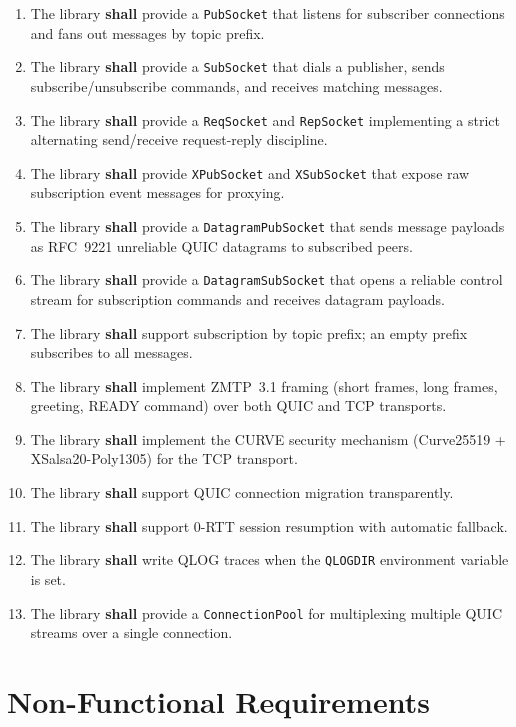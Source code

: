\documentclass[12pt, a4paper, oneside]{report}
\begin{document}
\begin{enumerate}[label=FR-\arabic*]
  \item The library \textbf{shall} provide a \texttt{PubSocket} that listens for subscriber connections and fans out messages by topic prefix.
  \item The library \textbf{shall} provide a \texttt{SubSocket} that dials a publisher, sends subscribe/unsubscribe commands, and receives matching messages.
  \item The library \textbf{shall} provide a \texttt{ReqSocket} and \texttt{RepSocket} implementing a strict alternating send/receive request-reply discipline.
  \item The library \textbf{shall} provide \texttt{XPubSocket} and \texttt{XSubSocket} that expose raw subscription event messages for proxying.
  \item The library \textbf{shall} provide a \texttt{DatagramPubSocket} that sends message payloads as RFC~9221 unreliable QUIC datagrams to subscribed peers.
  \item The library \textbf{shall} provide a \texttt{DatagramSubSocket} that opens a reliable control stream for subscription commands and receives datagram payloads.
  \item The library \textbf{shall} support subscription by topic prefix; an empty prefix subscribes to all messages.
  \item The library \textbf{shall} implement ZMTP~3.1 framing (short frames, long frames, greeting, READY command) over both QUIC and TCP transports.
  \item The library \textbf{shall} implement the CURVE security mechanism (Curve25519 + XSalsa20-Poly1305) for the TCP transport.
  \item The library \textbf{shall} support QUIC connection migration transparently.
  \item The library \textbf{shall} support 0-RTT session resumption with automatic fallback.
  \item The library \textbf{shall} write QLOG traces when the \texttt{QLOGDIR} environment variable is set.
  \item The library \textbf{shall} provide a \texttt{ConnectionPool} for multiplexing multiple QUIC streams over a single connection.
\end{enumerate}

\section{Non-Functional Requirements}
\label{sec:non-func-reqs}
\end{document}
